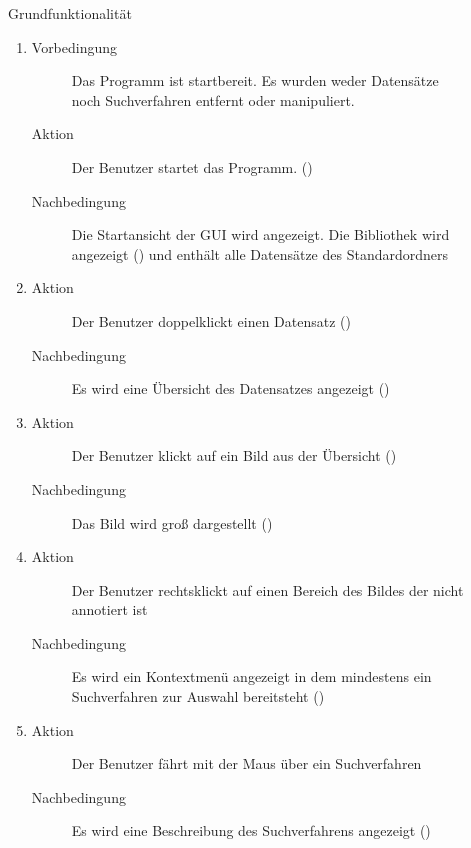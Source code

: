\begin{description} %
	\item[] Grundfunktionalität %
	\begin{enumerate}
		\item
		\begin{description}
			\item[Vorbedingung] Das Programm ist startbereit. Es wurden weder Datensätze noch Suchverfahren entfernt oder manipuliert.
			\item[Aktion] Der Benutzer startet das Programm. ()
			\item[Nachbedingung] Die Startansicht der GUI wird angezeigt. Die Bibliothek wird angezeigt () und enthält alle Datensätze des Standardordners
		\end{description}
		\item
		\begin{description}
			\item[Aktion] Der Benutzer doppelklickt einen Datensatz ()
			\item[Nachbedingung] Es wird eine Übersicht des Datensatzes angezeigt ()
		\end{description}
		\item
		\begin{description}
			\item[Aktion] Der Benutzer klickt auf ein Bild aus der Übersicht ()
			\item[Nachbedingung] Das Bild wird groß dargestellt ()
		\end{description}
		\item
		\begin{description}
			\item[Aktion] Der Benutzer rechtsklickt auf einen Bereich des Bildes der nicht annotiert ist
			\item[Nachbedingung] Es wird ein Kontextmenü angezeigt in dem mindestens ein Suchverfahren zur Auswahl bereitsteht ()
		\end{description}
		\item
		\begin{description}
			\item[Aktion] Der Benutzer fährt mit der Maus über ein Suchverfahren
			\item[Nachbedingung] Es wird eine Beschreibung des Suchverfahrens angezeigt ()

\end{description}
\end{enumerate}
\end{description}
